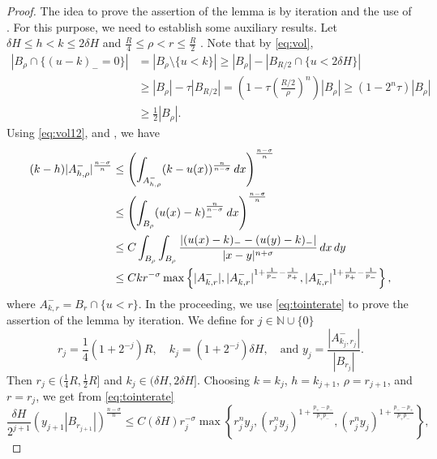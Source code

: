 \documentclass[11pt]{amsart}
\theoremstyle{plain}
\theoremstyle{definition}
\numberwithin{equation}{section}
\renewcommand{\d}{\textnormal{d}}
\newcommand{\N}{\mathbb{N}}
\begin{document}
\begin{proof}
The idea to prove the assertion of the lemma is by iteration and the use of . For this purpose, we need to establish some auxiliary results. 
Let $\delta H\leq h < k \leq 2\delta H$ and $\frac{R}{4} \leq \rho < r \leq \frac{R}{2}$ . 
Note that by \eqref{eq:vol}, 
\begin{equation}\label{eq:vol12}
\begin{aligned}
|B_{\rho} \cap \{ (u-k)_{-} = 0 \} | &= |B_{\rho}\setminus \{u<k\}| \geq |B_{\rho}| - |B_{R/2} \cap\{u<2\delta H\}| \\
& \geq |B_{\rho}| - \tau |B_{R/2}|  = \left(1-\tau \left(\frac{R/2}{\rho}\right)^n\right)|B_{\rho}| \geq \left( 1-2^n\tau \right)|B_{\rho}| \\
& \geq \frac{1}{2}|B_{\rho}|.
\end{aligned}
\end{equation}
Using \eqref{eq:vol12},  and , we have
\begin{equation}
\begin{aligned} \label{eq:tointerate}
(k-h) |A_{h,\rho}^{-}|^{\frac{n-\sigma}{n}}  &\leq \left(\int_{A_{h,\rho}^{-}} (k-u(x))^{\frac{n}{n-\sigma}} \, \d x  \right)^{\frac{n-\sigma}{n}} \\
& \leq \left(\int_{B_{\rho}} (u(x)-k)_{-}^{\frac{n}{n-\sigma}} \, \d x  \right)^{\frac{n-\sigma}{n}} \\
& \leq C\int_{B_{\rho}}\int_{B_{\rho}} \frac{|(u(x)-k)_{-} - (u(y)-k)_{-}|}{|x-y|^{n+\sigma}} \, \d x\, \d y \\
&\leq C k r^{-\sigma} \max \left\lbrace |A_{k, r}^-|, |A_{k, r}^-|^{1+\frac{1}{p_-}-\frac{1}{p_+}}, |A_{k,r}^-|^{1+\frac{1}{p_+} - \frac{1}{p_-}} \right\rbrace,
\end{aligned}
\end{equation}
where $A_{k, r}^- = B_r \cap \lbrace u < r \rbrace$. In the proceeding, we use \eqref{eq:tointerate} to prove the assertion of the lemma by iteration.
We define for $j\in \N\cup\{0\}$
\[ r_j = \frac{1}{4}(1+2^{-j})R, \quad k_j=(1+2^{-j})\delta H, \quad \text{and} \, \,   y_j = \frac{|A_{k_{j}, r_{j}}^{-}|}{|B_{r_j}|}. \]
Then $r_j \in (\frac{1}{4}R, \frac{1}{2}R]$ and $k_j\in (\delta H, 2\delta H]$. Choosing $k=k_{j}$, $h=k_{j+1}$, $\rho=r_{j+1}$, and $r=r_{j}$, we get from \eqref{eq:tointerate}
\[
\frac{\delta H}{2^{j+1}} \left(y_{j+1}|B_{r_{j+1}}|\right)^{\frac{n-\sigma}{n}} 
\leq C (\delta H) r_j^{-\sigma}\max\left\{ r_j^n y_j, (r_j^{n}y_j)^{1+\frac{p_{+}-p_{-}}{p_{+}p_{-}}}, (r_j^{n}y_j)^{1+\frac{p_{-}-p_{+}}{p_{+}p_{-}}} \right\},
\]
\end{proof}
\end{document}

